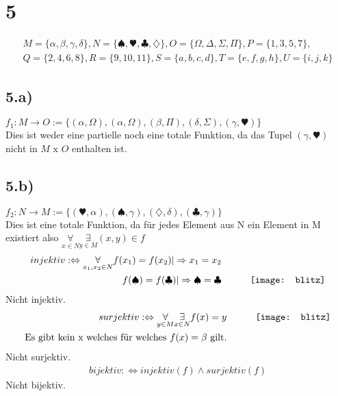 \documentclass[10pt,ngerman]{scrartcl}
\begin{document}
\section{5}
\begin{align*}
 M = \{\alpha, \beta, \gamma, \delta\}, N = \{\spadesuit, \varheart, \clubsuit, \diamondsuit\}, O = \{\Omega, \Delta, \Sigma, \Pi\}, P = \{1, 3, 5, 7\}, \\
 Q = \{2, 4, 6, 8\}, R = \{9, 10, 11\}, S = \{a, b, c, d\}, T = \{e, f , g, h\}, U = \{i, j, k \}
\end{align*}
\subsection{5.a)}
$f_1: M\longrightarrow O := \{(\alpha, \Omega), (\alpha, \Omega), (\beta, \Pi), (\delta, \Sigma), (\gamma,\varheart)\} $\\
Dies ist weder eine partielle noch eine totale Funktion, da das Tupel $(\gamma,\varheart)$ nicht in $M\text{ x }O$ enthalten ist.
\subsection{5.b)}
$f_2: N \longrightarrow M := \{(\varheart, \alpha), (\spadesuit, \gamma), (\diamondsuit, \delta), (\clubsuit, \gamma)\}$\\
Dies ist eine totale Funktion, da für jedes Element aus N ein Element in M existiert also $\underset{x \in N}{\forall} \underset{y \in M}{\exists} (x,y) \in f$
\begin{align*}
injektiv :\Leftrightarrow \underset{x_1,x_2 \in N}{\forall} f (x_1) = f (x_2) | \Rightarrow x_1 = x_2 \\ f(\spadesuit) = f(\clubsuit) | \Rightarrow \spadesuit = \clubsuit && \qquad \vcenter{\hbox{\texttt{[image: blitz]}}}
\end{align*}
Nicht injektiv.
\begin{align*}
surjektiv :\Leftrightarrow \underset{y \in M}{\forall} \underset{x \in N}{\exists} f(x) = y && \qquad \vcenter{\hbox{\texttt{[image: blitz]}}} \\
\text{Es gibt kein x welches für welches }f(x) = \beta \text{ gilt.}
\end{align*}
Nicht surjektiv.
\begin{align*}
 bijektiv :\Leftrightarrow injektiv (f ) \wedge surjektiv (f )
\end{align*}
Nicht bijektiv.
\end{document}
